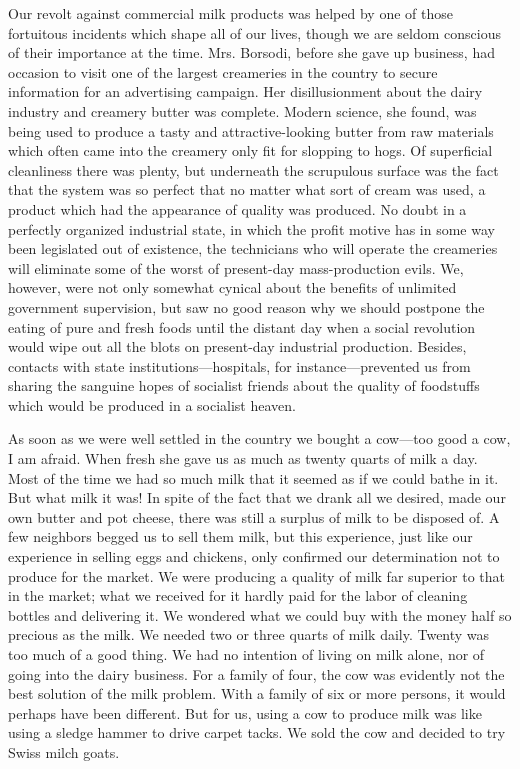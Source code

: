 \documentclass{book}
\begin{document}
Our revolt against commercial milk products was helped by one of those fortuitous incidents which shape all of our lives, though we are seldom conscious of their importance at the time. Mrs. Borsodi, before she gave up business, had occasion to visit one of the largest creameries in the country to secure information for an advertising campaign. Her disillusionment about the dairy industry and creamery butter was complete. Modern science, she found, was being used to produce a tasty and attractive-looking butter from raw materials which often came into the creamery only fit for slopping to hogs. Of superficial cleanliness there was plenty, but underneath the scrupulous surface was the fact that the system was so perfect that no matter what sort of cream was used, a product which had the appearance of quality was produced. No doubt in a perfectly organized industrial state, in which the profit motive has in some way been legislated out of existence, the technicians who will operate the creameries will eliminate some of the worst of present-day mass-production evils. We, however, were not only somewhat cynical about the benefits of unlimited government supervision, but saw no good reason why we should postpone the eating of pure and fresh foods until the distant day when a social revolution would wipe out all the blots on present-day industrial production. Besides, contacts with state institutions—hospitals, for instance—prevented us from sharing the sanguine hopes of socialist friends about the quality of foodstuffs which would be produced in a socialist heaven.

As soon as we were well settled in the country we bought a cow—too good a cow, I am afraid. When fresh she gave us as much as twenty quarts of milk a day. Most of the time we had so much milk that it seemed as if we could bathe in it. But what milk it was! In spite of the fact that we drank all we desired, made our own butter and pot cheese, there was still a surplus of milk to be disposed of. A few neighbors begged us to sell them milk, but this experience, just like our experience in selling eggs and chickens, only confirmed our determination not to produce for the market. We were producing a quality of milk far superior to that in the market; what we received for it hardly paid for the labor of cleaning bottles and delivering it. We wondered what we could buy with the money half so precious as the milk. We needed two or three quarts of milk daily. Twenty was too much of a good thing. We had no intention of living on milk alone, nor of going into the dairy business. For a family of four, the cow was evidently not the best solution of the milk problem. With a family of six or more persons, it would perhaps have been different. But for us, using a cow to produce milk was like using a sledge hammer to drive carpet tacks. We sold the cow and decided to try Swiss milch goats.
\end{document}
